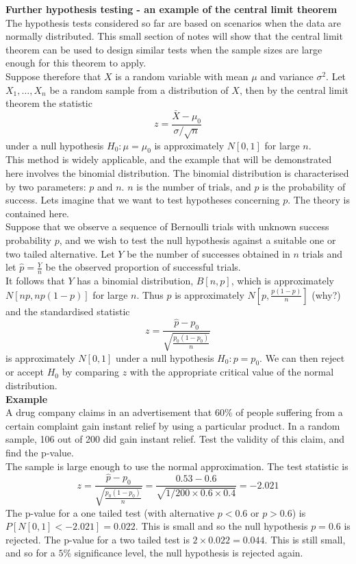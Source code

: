 \documentclass[12pt]{article}
\begin{document}
\nonumber
\textbf{Further hypothesis testing - an example of the central limit theorem}\\

The hypothesis tests considered so far are based on scenarios when the data are normally distributed. This small section of notes will show that the central limit theorem can be used to design similar tests when the sample sizes are large enough for this theorem to apply.\\

Suppose therefore that $X$ is a random variable with mean $\mu$ and variance $\sigma^{2}$. Let $X_{1},\ldots,X_{n}$ be a random sample from a distribution of $X$, then by the central limit theorem the statistic $$z=\frac{\bar{X}-\mu_{0}}{\sigma/\sqrt{n}}$$ under a null hypothesis $H_{0}:\mu=\mu_{0}$ is approximately $N[0,1]$ for large $n$.\\

This method is widely applicable, and the example that will be demonstrated here involves the binomial distribution. The binomial distribution is characterised by two parameters: $p$ and $n$. $n$ is the number of trials, and $p$ is the probability of success. Lets imagine that we want to test hypotheses concerning $p$. The theory is contained here.\\

Suppose that we observe a sequence of Bernoulli trials with unknown success probability $p$, and we wish to test the null hypothesis against a suitable one or two tailed alternative. Let $Y$ be the number of successes obtained in $n$ trials and let $\hat{p}=\frac{Y}{n}$ be the observed proportion of successful trials.\\

It follows that $Y$ has a binomial distribution, $B[n,p]$, which is approximately $N[np,np(1-p)]$ for large $n$. Thus $\hat{p}$ is approximately $N[p,\frac{p(1-p)}{n}]$ (why?) and the standardised statistic $$z=\frac{\hat{p}-p_0}{\sqrt{\frac{p_0(1-p_0)}{n}}}$$ is approximately $N[0,1]$ under a null hypothesis $H_{0}:p=p_0$. We can then reject or accept $H_{0}$ by comparing $z$ with the appropriate critical value of the normal distribution.\\

\textbf{Example}\\
A drug company claims in an advertisement that $60\%$ of people suffering from a certain complaint gain instant relief by using a particular product. In a random sample, 106 out of 200 did gain instant relief. Test the validity of this claim, and find the p-value.\\  

The sample is large enough to use the normal approximation. The test statistic is $$z=\frac{\hat{p}-p_0}{\sqrt{\frac{p_0(1-p_0)}{n}}}=\frac{0.53-0.6}{\sqrt{1/200 \times 0.6 \times 0.4}}=-2.021$$
The p-value for a one tailed test (with alternative $p<0.6$ or $p>0.6$) is $P[N[0,1]<-2.021]=0.022$. This is small and so the null hypothesis $p=0.6$ is rejected. The p-value for a two tailed test is $2 \times 0.022=0.044$. This is still small, and so for a $5\%$ significance level, the null hypothesis is rejected again.
\end{document}
